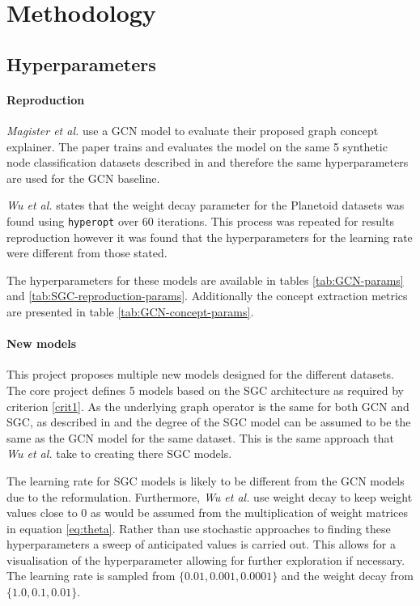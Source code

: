 \section{Methodology}

\subsection{Hyperparameters}
\label{sec:hyperparameters}

\paragraph{Reproduction}
\textit{Magister et al.}\cite{magister2021gcexplainer} use a GCN model to evaluate their proposed graph concept explainer.
The paper trains and evaluates the model on the same 5 synthetic node classification datasets described in  and therefore the same hyperparameters are used for the GCN baseline.

\textit{Wu et al.}\cite{wu2019simplifying} states that the weight decay parameter for the Planetoid\cite{kipf2016semi} datasets was found using \texttt{hyperopt} over 60 iterations.
This process was repeated for results reproduction however it was found that the hyperparameters for the learning rate were different from those stated.

The hyperparameters for these models are available in tables \ref{tab:GCN-params} and \ref{tab:SGC-reproduction-params}.
Additionally the concept extraction metrics are presented in table \ref{tab:GCN-concept-params}.

%
%
%

\paragraph{New models}
This project proposes multiple new models designed for the different datasets.
The core project defines 5 models based on the SGC architecture as required by criterion \ref{crit1}.
As the underlying graph operator is the same for both GCN and SGC, as described in  and  the degree of the SGC model can be assumed to be the same as the GCN model for the same dataset.
This is the same approach that \textit{Wu et al.}\cite{wu2019simplifying} take to creating there SGC models.

The learning rate for SGC models is likely to be different from the GCN models due to the reformulation.
Furthermore, \textit{Wu et al.}\cite{wu2019simplifying} use weight decay to keep weight values close to $0$ as would be assumed from the multiplication of weight matrices in equation \ref{eq:theta}.
Rather than use stochastic approaches to finding these hyperparameters a sweep of anticipated values is carried out.
This allows for a visualisation of the hyperparameter allowing for further exploration if necessary.
The learning rate is sampled from $\{0.01, 0.001, 0.0001\}$ and the weight decay from $\{1.0, 0.1, 0.01\}$.

